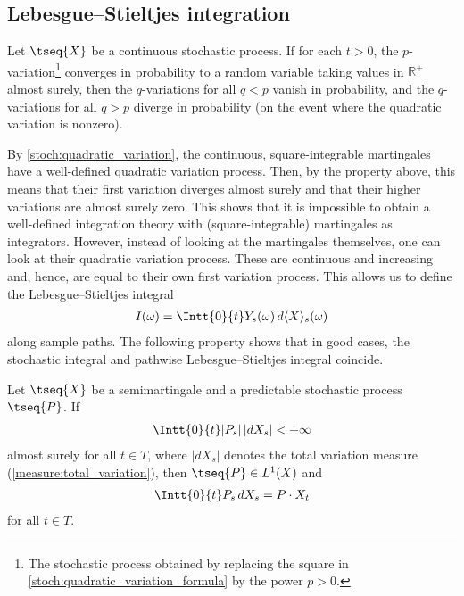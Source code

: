\subsection{Lebesgue--Stieltjes integration}

    \begin{property}
        Let $\tseq{X}$ be a continuous stochastic process. If for each $t>0$, the $p$-variation\footnote{The stochastic process obtained by replacing the square in \cref{stoch:quadratic_variation_formula} by the power $p>0$.} converges in probability to a random variable taking values in $\mathbb{R}^+$ almost surely, then the $q$-variations for all $q<p$ vanish in probability, and the $q$-variations for all $q>p$ diverge in probability (on the event where the quadratic variation is nonzero).
    \end{property}
    By \cref{stoch:quadratic_variation}, the continuous, square-integrable martingales have a well-defined quadratic variation process. Then, by the property above, this means that their first variation diverges almost surely and that their higher variations are almost surely zero. This shows that it is impossible to obtain a well-defined integration theory with (square-integrable) martingales as integrators. However, instead of looking at the martingales themselves, one can look at their quadratic variation process. These are continuous and increasing and, hence, are equal to their own first variation process. This allows us to define the Lebesgue--Stieltjes integral
    \begin{gather}
        I(\omega) = \Intt{0}{t} Y_s(\omega)\,d\langle X \rangle_s(\omega)
    \end{gather}
    along sample paths. The following property shows that in good cases, the stochastic integral and pathwise Lebesgue--Stieltjes integral coincide.
    \begin{property}
        Let $\tseq{X}$ be a semimartingale and a predictable stochastic process $\tseq{P}$. If
        \begin{gather}
            \Intt{0}{t}|P_s|\,|dX_s| < +\infty
        \end{gather}
        almost surely for all $t\in T$, where $|dX_s|$ denotes the total variation measure (\cref{measure:total_variation}), then $\tseq{P}\in L^1(X)$ and
        \begin{gather}
            \Intt{0}{t}P_s\,dX_s = P\cdot X_t
        \end{gather}
        for all $t\in T$.
    \end{property}

